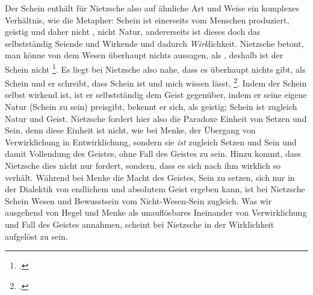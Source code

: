 \documentclass[12pt, a4paper, openany]{report}
\begin{document}
Der Schein enthält für Nietzsche also auf ähnliche Art und Weise ein komplexes Verhältnis, wie die Metapher: 
Schein ist einerseits vom Menschen produziert, geistig und daher nicht , nicht Natur, andererseits ist dieses doch das selbstständig Seiende und Wirkende und dadurch \emph{Wirk}lichkeit.
Nietzsche betont, man könne von dem Wesen überhaupt nichts aussagen, als , deshalb ist der Schein nicht \footcite[][417]{nietzsche_geburt_1999}.
Es liegt bei Nietzsche also nahe, dass es überhaupt nichts gibt, als Schein und er schreibt, dass Schein  ist und mich wissen lässt, \footcite[][417]{nietzsche_morgenrote_1999}.
Indem der Schein selbst wirkend ist, ist er selbstständig dem Geist gegenüber, indem er seine eigene Natur (Schein zu sein) preisgibt, bekennt er sich, als geistig;
Schein ist zugleich Natur und Geist.
Nietzsche fordert hier also die Paradoxe Einheit von Setzen und Sein, denn diese Einheit ist nicht, wie bei Menke, der Übergang von Verwirklichung in Entwirklichung, sondern sie \emph{ist} zugleich Setzen und Sein und damit Vollendung des Geistes, ohne Fall des Geistes zu sein.
Hinzu kommt, dass Nietzsche dies nicht nur fordert, sondern, dass es sich nach ihm wirklich so verhält.
Während bei Menke die Macht des Geistes, Sein zu setzen, sich nur in der Dialektik von endlichem und absolutem Geist ergeben kann,
ist bei Nietzsche Schein Wesen und Bewusstsein vom Nicht-Wesen-Sein zugleich.
Was wir ausgehend von Hegel und Menke als unauflösbares Ineinander von Verwirklichung und Fall des Geistes annahmen, scheint bei Nietzsche in der Wirklichkeit aufgelöst zu sein. \\
\end{document}
